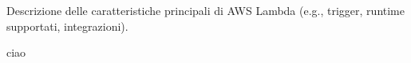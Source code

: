 Descrizione delle caratteristiche principali di AWS Lambda (e.g., trigger, runtime supportati, integrazioni).

ciao